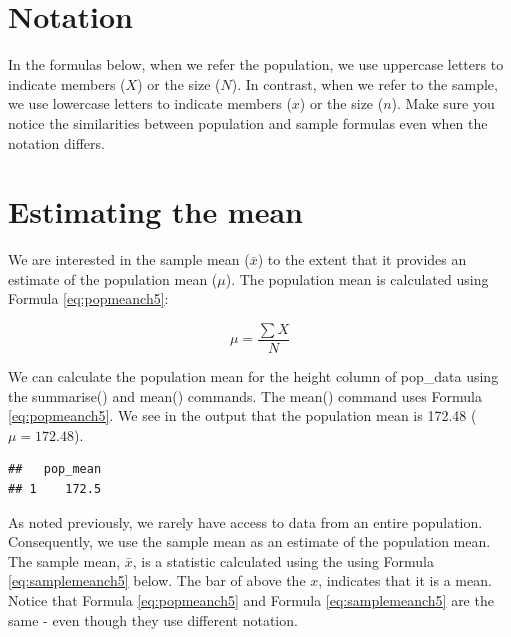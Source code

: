 \documentclass[
]{krantz}
\makeatletter
\newenvironment{Shaded}{\begin{snugshade}}{\end{snugshade}}
\newcommand{\DataTypeTok}[1]{\textcolor[rgb]{0.27,0.27,0.27}{#1}}
\newcommand{\KeywordTok}[1]{\textcolor[rgb]{0.27,0.27,0.27}{\textbf{#1}}}
\newcommand{\NormalTok}[1]{#1}
\newcommand{\OperatorTok}[1]{\textcolor[rgb]{0.43,0.43,0.43}{\textbf{#1}}}
\newcommand{\StringTok}[1]{\textcolor[rgb]{0.5,0.5,0.5}{#1}}
\newenvironment{kframe}{%
\medskip{}
\setlength{\fboxsep}{.8em}
 \def\at@end@of@kframe{}%
 \ifinner\ifhmode%
  \def\at@end@of@kframe{\end{minipage}}%
  \begin{minipage}{\columnwidth}%
 \fi\fi%
 \def\FrameCommand##1{\hskip\@totalleftmargin \hskip-\fboxsep
 \colorbox{shadecolor}{##1}\hskip-\fboxsep
     \hskip-\linewidth \hskip-\@totalleftmargin \hskip\columnwidth}%
 \MakeFramed {\advance\hsize-\width
   \@totalleftmargin\z@ \linewidth\hsize
   \@setminipage}}%
 {\par\unskip\endMakeFramed%
 \at@end@of@kframe}
\renewenvironment{Shaded}{\begin{kframe}}{\end{kframe}}
\makeatother
\begin{document}
\hypertarget{notation-1}{%
\section{Notation}\label{notation-1}}

In the formulas below, when we refer the population, we use uppercase letters to indicate members (\(X\)) or the size (\(N\)). In contrast, when we refer to the sample, we use lowercase letters to indicate members (\(x\)) or the size (\(n\)). Make sure you notice the similarities between population and sample formulas even when the notation differs.

\hypertarget{estimating-the-mean}{%
\section{Estimating the mean}\label{estimating-the-mean}}

We are interested in the sample mean (\(\bar{x}\)) to the extent that it provides an estimate of the population mean (\(\mu\)). The population mean is calculated using Formula \eqref{eq:popmeanch5}:

\begin{equation} 
\mu = \frac{\sum{X}}{N}
      \label{eq:popmeanch5}
\end{equation}

We can calculate the population mean for the height column of pop\_data using the summarise() and mean() commands. The mean() command uses Formula \eqref{eq:popmeanch5}. We see in the output that the population mean is 172.48 (\(\mu = 172.48\)).

\begin{Shaded}
\end{Shaded}

\begin{verbatim}
##   pop_mean
## 1    172.5
\end{verbatim}

As noted previously, we rarely have access to data from an entire population. Consequently, we use the sample mean as an estimate of the population mean. The sample mean, \(\bar{x}\), is a statistic calculated using the using Formula \eqref{eq:samplemeanch5} below. The bar of above the \(x\), indicates that it is a mean. Notice that Formula \eqref{eq:popmeanch5} and Formula \eqref{eq:samplemeanch5} are the same - even though they use different notation.
\end{document}
